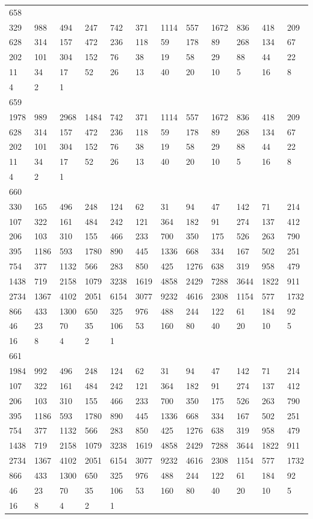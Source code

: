 \begin{longtable}{llllllllllll}
658&&&&&&&&&&&\\
329& 988& 494& 247& 742& 371& 1114& 557& 1672& 836& 418& 209\\
628& 314& 157& 472& 236& 118& 59& 178& 89& 268& 134& 67\\
202& 101& 304& 152& 76& 38& 19& 58& 29& 88& 44& 22\\
11& 34& 17& 52& 26& 13& 40& 20& 10& 5& 16& 8\\
4& 2& 1& \\

659&&&&&&&&&&&\\
1978& 989& 2968& 1484& 742& 371& 1114& 557& 1672& 836& 418& 209\\
628& 314& 157& 472& 236& 118& 59& 178& 89& 268& 134& 67\\
202& 101& 304& 152& 76& 38& 19& 58& 29& 88& 44& 22\\
11& 34& 17& 52& 26& 13& 40& 20& 10& 5& 16& 8\\
4& 2& 1& \\

660&&&&&&&&&&&\\
330& 165& 496& 248& 124& 62& 31& 94& 47& 142& 71& 214\\
107& 322& 161& 484& 242& 121& 364& 182& 91& 274& 137& 412\\
206& 103& 310& 155& 466& 233& 700& 350& 175& 526& 263& 790\\
395& 1186& 593& 1780& 890& 445& 1336& 668& 334& 167& 502& 251\\
754& 377& 1132& 566& 283& 850& 425& 1276& 638& 319& 958& 479\\
1438& 719& 2158& 1079& 3238& 1619& 4858& 2429& 7288& 3644& 1822& 911\\
2734& 1367& 4102& 2051& 6154& 3077& 9232& 4616& 2308& 1154& 577& 1732\\
866& 433& 1300& 650& 325& 976& 488& 244& 122& 61& 184& 92\\
46& 23& 70& 35& 106& 53& 160& 80& 40& 20& 10& 5\\
16& 8& 4& 2& 1& \\

661&&&&&&&&&&&\\
1984& 992& 496& 248& 124& 62& 31& 94& 47& 142& 71& 214\\
107& 322& 161& 484& 242& 121& 364& 182& 91& 274& 137& 412\\
206& 103& 310& 155& 466& 233& 700& 350& 175& 526& 263& 790\\
395& 1186& 593& 1780& 890& 445& 1336& 668& 334& 167& 502& 251\\
754& 377& 1132& 566& 283& 850& 425& 1276& 638& 319& 958& 479\\
1438& 719& 2158& 1079& 3238& 1619& 4858& 2429& 7288& 3644& 1822& 911\\
2734& 1367& 4102& 2051& 6154& 3077& 9232& 4616& 2308& 1154& 577& 1732\\
866& 433& 1300& 650& 325& 976& 488& 244& 122& 61& 184& 92\\
46& 23& 70& 35& 106& 53& 160& 80& 40& 20& 10& 5\\
16& 8& 4& 2& 1& \\


\end{longtable}
